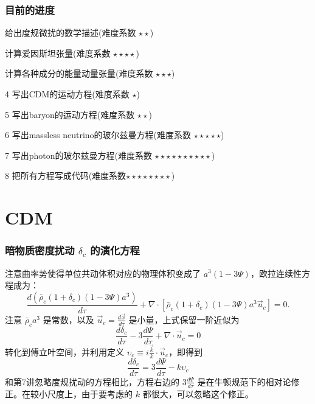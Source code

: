 \documentclass[CJK,13pt]{beamer}
\date{}
\begin{document}
  \bch

  

  \begin{frame}
    \frametitle{目前的进度}
    \bitem
  \item[\checkmark]{给出度规微扰的数学描述(难度系数 $\star\star$)}
  \item[\checkmark]{计算爱因斯坦张量(难度系数 $\star\star\star\star$)}
  \item[\checkmark]{计算各种成分的能量动量张量(难度系数 $\star\star\star$)}    
  \item[4]{写出CDM的运动方程(难度系数 $\star$)}
  \item[5]{写出baryon的运动方程(难度系数 $\star\star$)}        
  \item[6]{写出massless neutrino的玻尔兹曼方程(难度系数 $\star\star\star\star\star$)}
  \item[7]{写出photon的玻尔兹曼方程(难度系数 $\star\star\star\star\star\star\star\star\star\star$)}
  \item[8]{把所有方程写成代码(难度系数$\star\star\star\star\star\star\star\star$)}
    \eitem

  \end{frame}
  

  \section{CDM}

  
    \begin{frame}
      \frametitle{暗物质密度扰动 $\delta_c$ 的演化方程}
      注意曲率势使得单位共动体积对应的物理体积变成了 $a^3(1-3\Psi)$，欧拉连续性方程成为：
      $$\frac{d\left(\bar{\rho}_c(1+\delta_c)(1-3\Psi)a^3\right)}{d\tau} + \nabla\cdot\left[\bar{\rho}_c(1+\delta_c)(1-3\Psi)a^3 \vec{u}_c\right] = 0.$$
      注意 $\bar{\rho}_c a^3$ 是常数，以及 $\vec{u}_c = \frac{d\vec{x}}{d\tau}$ 是小量，上式保留一阶近似为
      $$ \frac{d\delta_c}{d\tau} - 3\frac{d\Psi}{d\tau} + \nabla\cdot \vec{u}_c = 0 $$
      转化到傅立叶空间，并利用定义 $\upsilon_c\equiv i\frac{\vec{k}}{k}\cdot\vec{u}_c$，即得到
      {\blue      $$ \frac{d\delta_c}{d\tau} = 3\frac{d\Psi}{d\tau} - k\upsilon_c $$}
      和第7讲忽略度规扰动的方程相比，方程右边的 $3\frac{d\Psi}{d\tau}$ 是在牛顿规范下的相对论修正。在较小尺度上，由于要考虑的 $k$ 都很大，可以忽略这个修正。
    \end{frame}
    
\end{document}
